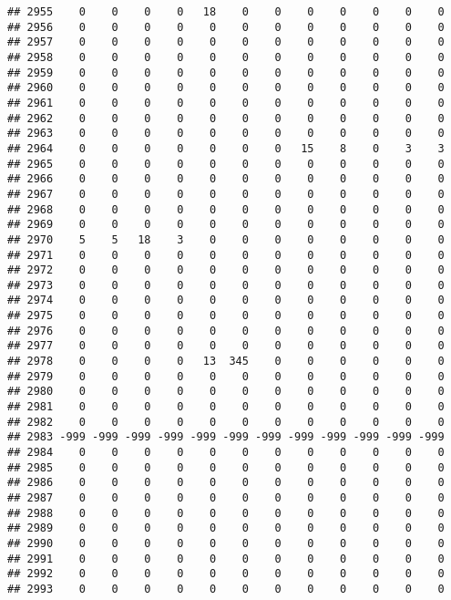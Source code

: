 \documentclass[]{article}
\begin{document}
\begin{verbatim}
## 2955    0    0    0    0   18    0    0    0    0    0    0    0
## 2956    0    0    0    0    0    0    0    0    0    0    0    0
## 2957    0    0    0    0    0    0    0    0    0    0    0    0
## 2958    0    0    0    0    0    0    0    0    0    0    0    0
## 2959    0    0    0    0    0    0    0    0    0    0    0    0
## 2960    0    0    0    0    0    0    0    0    0    0    0    0
## 2961    0    0    0    0    0    0    0    0    0    0    0    0
## 2962    0    0    0    0    0    0    0    0    0    0    0    0
## 2963    0    0    0    0    0    0    0    0    0    0    0    0
## 2964    0    0    0    0    0    0    0   15    8    0    3    3
## 2965    0    0    0    0    0    0    0    0    0    0    0    0
## 2966    0    0    0    0    0    0    0    0    0    0    0    0
## 2967    0    0    0    0    0    0    0    0    0    0    0    0
## 2968    0    0    0    0    0    0    0    0    0    0    0    0
## 2969    0    0    0    0    0    0    0    0    0    0    0    0
## 2970    5    5   18    3    0    0    0    0    0    0    0    0
## 2971    0    0    0    0    0    0    0    0    0    0    0    0
## 2972    0    0    0    0    0    0    0    0    0    0    0    0
## 2973    0    0    0    0    0    0    0    0    0    0    0    0
## 2974    0    0    0    0    0    0    0    0    0    0    0    0
## 2975    0    0    0    0    0    0    0    0    0    0    0    0
## 2976    0    0    0    0    0    0    0    0    0    0    0    0
## 2977    0    0    0    0    0    0    0    0    0    0    0    0
## 2978    0    0    0    0   13  345    0    0    0    0    0    0
## 2979    0    0    0    0    0    0    0    0    0    0    0    0
## 2980    0    0    0    0    0    0    0    0    0    0    0    0
## 2981    0    0    0    0    0    0    0    0    0    0    0    0
## 2982    0    0    0    0    0    0    0    0    0    0    0    0
## 2983 -999 -999 -999 -999 -999 -999 -999 -999 -999 -999 -999 -999
## 2984    0    0    0    0    0    0    0    0    0    0    0    0
## 2985    0    0    0    0    0    0    0    0    0    0    0    0
## 2986    0    0    0    0    0    0    0    0    0    0    0    0
## 2987    0    0    0    0    0    0    0    0    0    0    0    0
## 2988    0    0    0    0    0    0    0    0    0    0    0    0
## 2989    0    0    0    0    0    0    0    0    0    0    0    0
## 2990    0    0    0    0    0    0    0    0    0    0    0    0
## 2991    0    0    0    0    0    0    0    0    0    0    0    0
## 2992    0    0    0    0    0    0    0    0    0    0    0    0
## 2993    0    0    0    0    0    0    0    0    0    0    0    0

\end{verbatim}
\end{document}

